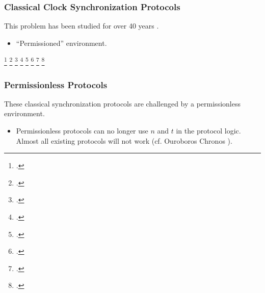 \begin{frame}
    \frametitle{Classical Clock Synchronization Protocols}

    This problem has been studied for over 40 years \cite{DBLP:journals/cacm/Lamport78,byzantine-clock-synchronization,fault-tolerant-clock-synchronization,DBLP:journals/jcss/DolevHS86,DBLP:journals/jacm/SrikanthT87,WELCH19881,DBLP:conf/fc/AbrahamDDN019,podc22}.

    \begin{itemize}
         Optimal skew: $\approx$ transmission uncertainty when \# of parties is large.
         Optimal linear envelope: as good as the linear envelope on physical clocks.
        \item<3-> ``Permissioned'' environment.
    \end{itemize}

    \footcite{DBLP:journals/cacm/Lamport78}
    \footcite{byzantine-clock-synchronization}
    \footcite{fault-tolerant-clock-synchronization}
    \footcite{DBLP:journals/jcss/DolevHS86}
    \footcite{DBLP:journals/jacm/SrikanthT87}
    \footcite{WELCH19881}
    \footcite{DBLP:conf/fc/AbrahamDDN019}
    \footcite{podc22}
\end{frame}

\begin{frame}
    \frametitle{Permissionless Protocols}

    These classical synchronization protocols are challenged by a permissionless environment.


    \begin{itemize}
        \item<3-> Permissionless protocols can no longer use $n$ and $t$ in the protocol logic.
             Almost all existing protocols will not work (cf. Ouroboros Chronos \cite*[Eurocrypt '21]{ouroboros-chronos}).
    \end{itemize}
\end{frame}

